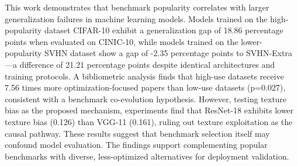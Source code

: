 
This work demonstrates that benchmark popularity correlates with larger generalization failures in machine learning models. Models trained on the high-popularity dataset CIFAR-10 exhibit a generalization gap of 18.86 percentage points when evaluated on CINIC-10, while models trained on the lower-popularity SVHN dataset show a gap of -2.35 percentage points to SVHN-Extra---a difference of 21.21 percentage points despite identical architectures and training protocols. A bibliometric analysis finds that high-use datasets receive 7.56 times more optimization-focused papers than low-use datasets (p=0.027), consistent with a benchmark co-evolution hypothesis. However, testing texture bias as the proposed mechanism, experiments find that ResNet-18 exhibits lower texture bias (0.126) than VGG-11 (0.161), ruling out texture exploitation as the causal pathway. These results suggest that benchmark selection itself may confound model evaluation. The findings support complementing popular benchmarks with diverse, less-optimized alternatives for deployment validation.

